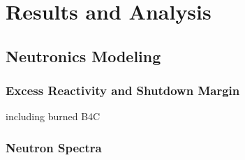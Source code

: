 \chapter{Results and Analysis}
\label{Chapter:Results}

\section{Neutronics Modeling}
\subsection{Excess Reactivity and Shutdown Margin}
including burned B4C

\subsection{Neutron Spectra}
